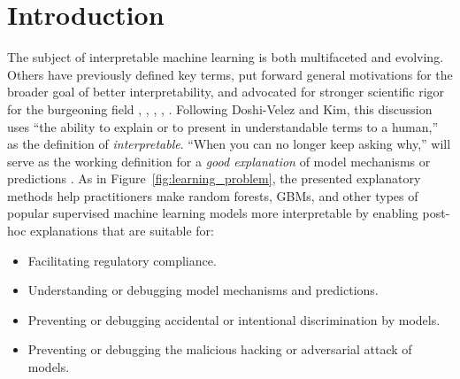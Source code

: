 \documentclass[sigconf, review]{acmart}
\begin{document}
\maketitle

\section{Introduction}

The subject of interpretable machine learning is both multifaceted and evolving. Others have previously defined key terms, put forward general motivations for the broader goal of better interpretability, and advocated for stronger scientific rigor for the burgeoning field \cite{been_kim1}, \cite{gilpin2018explaining}, \cite{guidotti2018survey}, \cite{lipton1}, \cite{weller2017challenges}. Following Doshi-Velez and Kim, this discussion uses ``the ability to explain or to present in understandable terms to a human,'' as the definition of \textit{interpretable}. ``When you can no longer keep asking why,'' will serve as the working definition for a \textit{good explanation} of model mechanisms or predictions \cite{gilpin2018explaining}. As in Figure~\ref{fig:learning_problem}, the presented explanatory methods help practitioners make random forests, GBMs, and other types of popular supervised machine learning models more interpretable by enabling post-hoc explanations that are suitable for:\\

\begin{itemize}
	\item Facilitating regulatory compliance.
	\item Understanding or debugging model mechanisms and predictions.
	\item Preventing or debugging accidental or intentional discrimination by models.
	\item Preventing or debugging the malicious hacking or adversarial attack of models.
\end{itemize}
\end{document}
